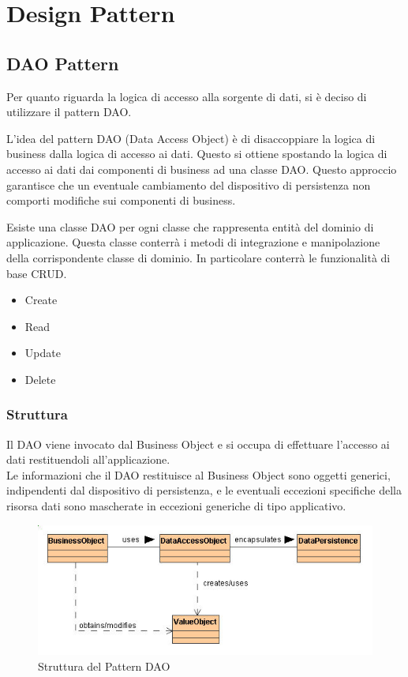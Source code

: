 \chapter{Design Pattern}
\section{DAO Pattern}
\medskip
Per quanto riguarda la logica di accesso alla sorgente di dati, si è deciso di utilizzare il pattern DAO.

L'idea del pattern DAO (Data Access Object) è di disaccoppiare la logica di business dalla logica di accesso ai dati. Questo si ottiene spostando la logica di accesso ai dati dai componenti di business ad una classe DAO. Questo approccio garantisce che un eventuale cambiamento del dispositivo di persistenza non comporti modifiche sui componenti di business.

Esiste una classe DAO per ogni classe che rappresenta entità del dominio di applicazione. Questa classe conterrà i metodi di integrazione e manipolazione della corrispondente classe di dominio. In particolare conterrà le funzionalità di base CRUD.
\begin{itemize}
\item Create
\item Read
\item Update
\item Delete
\end{itemize}
\subsection*{Struttura}
Il DAO viene invocato dal Business Object e si occupa di effettuare l'accesso ai dati restituendoli all'applicazione.\\

Le informazioni che il DAO restituisce al Business Object sono oggetti generici, indipendenti dal dispositivo di persistenza, e le eventuali eccezioni specifiche della risorsa dati sono mascherate in eccezioni generiche di tipo applicativo.

\begin{figure}[tb]
\includegraphics[width=\textwidth]{img/patternDao.jpg} 
\caption{Struttura del Pattern DAO}
\end{figure}

